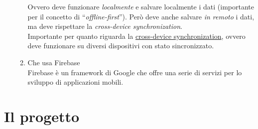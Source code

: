 \begin{enumerate}
\begin{enumerate}
        Ovvero deve funzionare \textit{localmente} e salvare localmente i dati (importante per il concetto di ``\textit{offline-first}''). Però deve anche salvare \textit{in remoto} i dati, ma deve rispettare la \textit{cross-device synchronization}.\\
        Importante per quanto riguarda la \underline{cross-device synchronization}, ovvero deve funzionare su diversi dispositivi con stato sincronizzato.
        \item Che usa Firebase\\
        Firebase è un framework di Google che offre una serie di servizi per lo sviluppo di applicazioni mobili.
    \end{enumerate}
\end{enumerate}

\section{Il progetto}
